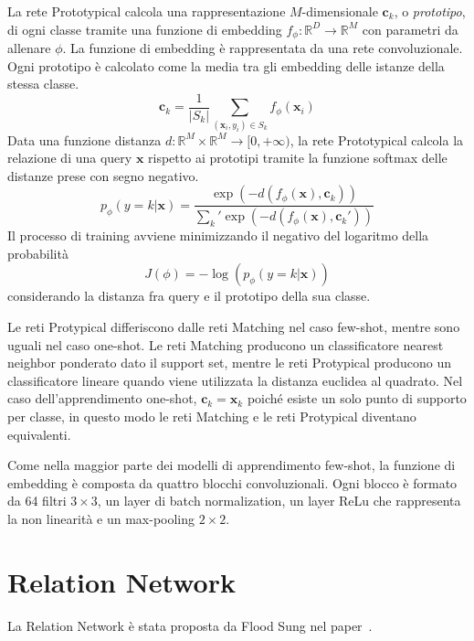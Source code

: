 \documentclass[12pt,a4paper,titlepage]{article}
\begin{document}
La rete Prototypical calcola una rappresentazione $M$-dimensionale $\mathbf{c}_k$, o \emph{prototipo}, di ogni classe tramite una funzione di embedding $f_\phi : \mathbb{R}^D \rightarrow \mathbb{R}^M$ con parametri da allenare $\phi$. La funzione di embedding è rappresentata da una rete convoluzionale. Ogni prototipo è calcolato come la media tra gli embedding delle istanze della stessa classe.
\begin{equation}
	\mathbf{c}_k=\frac{1}{|S_k|}\sum_{(\mathbf{x}_i,y_i)\in S_k}f_\phi (\mathbf{x}_i)
\end{equation}
Data una funzione distanza $d: \mathbb{R}^M \times \mathbb{R}^M \rightarrow [0, +\infty )$, la rete Prototypical calcola la relazione di una query $\mathbf{x}$ rispetto ai prototipi tramite la funzione softmax delle distanze prese con segno negativo.
\begin{equation}\label{eq:softmax}
p_\phi(y=k|\mathbf{x})=\dfrac{\exp(-d(f_\phi(\mathbf{x}),\mathbf{c}_k))}{\sum_k' \exp(-d(f_\phi(\mathbf{x}),\mathbf{c}_k'))}
\end{equation}
Il processo di training avviene minimizzando il negativo del logaritmo della probabilità
\begin{equation}\label{eq:loss_proto}
	J(\phi)=-\log\left(p_\phi(y=k|\mathbf{x})\right)
\end{equation}
considerando la distanza fra query e il prototipo della sua classe.

Le reti Protypical differiscono dalle reti Matching nel caso few-shot, mentre sono uguali nel caso one-shot. Le reti Matching producono un classificatore nearest neighbor ponderato dato il support set, mentre le reti Protypical producono un classificatore lineare quando viene utilizzata la distanza euclidea al quadrato. Nel caso dell'apprendimento one-shot, $\mathbf{c}_k = \mathbf{x}_k$ poiché esiste un solo punto di supporto per classe, in questo modo le reti Matching e le reti Protypical diventano equivalenti.

Come nella maggior parte dei modelli di apprendimento few-shot, la funzione di embedding è composta da quattro blocchi convoluzionali. Ogni blocco è formato da 64 filtri $3 \times 3$, un layer di batch normalization, un layer ReLu che rappresenta la non linearità e un max-pooling $2 \times 2$.

\clearpage

\section{Relation Network}
\label{sec:relation}
La Relation Network è stata proposta da Flood Sung nel paper~\cite{sung:relation}.
\end{document}
